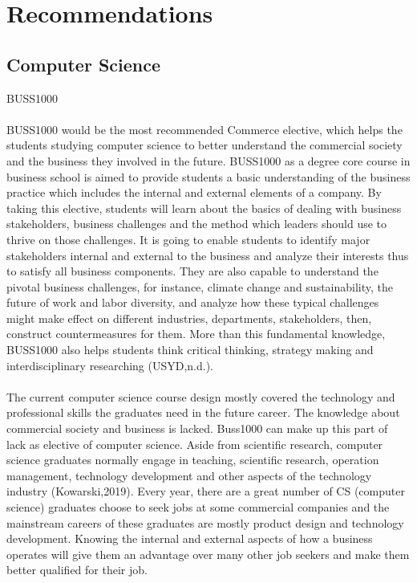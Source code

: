 \documentclass{article}
\begin{document}
	\section{Recommendations}
	\subsection{Computer Science}
	BUSS1000 \\
	\\
	BUSS1000 would be the most recommended Commerce elective, which helps the students studying computer science to better understand the commercial society and the business they involved in the future. BUSS1000 as a degree core course in business school is aimed to provide students a basic understanding of the business practice which includes the internal and external elements of a company. By taking this elective, students will learn about the basics of dealing with business stakeholders, business challenges and the method which leaders should use to thrive on those challenges. It is going to enable students to identify major stakeholders internal and external to the business and analyze their interests thus to satisfy all business components. They are also capable to understand the pivotal business challenges, for instance, climate change and sustainability, the future of work and labor diversity, and analyze how these typical challenges might make effect on different industries, departments, stakeholders, then, construct countermeasures for them. More than this fundamental knowledge, BUSS1000 also helps students think critical thinking, strategy making and interdisciplinary researching (USYD,n.d.). \\
	\\
	The current computer science course design mostly covered the technology and professional skills the graduates need in the future career. The knowledge about commercial society and business is lacked. Buss1000 can make up this part of lack as elective of computer science. Aside from scientific research, computer science graduates normally engage in teaching, scientific research, operation management, technology development and other aspects of the technology industry (Kowarski,2019). Every year, there are a great number of CS (computer science) graduates choose to seek jobs at some commercial companies and the mainstream careers of these graduates are mostly product design and technology development. Knowing the internal and external aspects of how a business operates will give them an advantage over many other job seekers and make them better qualified for their job. \\
\end{document}

